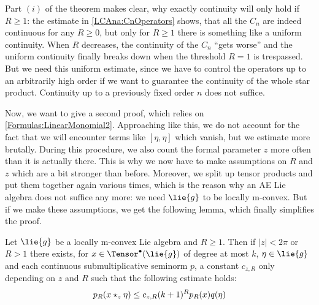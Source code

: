 \begin{remark}
	Part $(i)$ of the theorem makes clear, why exactly continuity will 
	only hold if $R \geq 1$: the estimate in \eqref{LCAna:CnOperators} shows, 
	that all the $C_n$ are indeed continuous for any $R \geq 0$, but only 
	for $R \geq 1$ there is something like a uniform continuity. When $R$ 
	decreases, the continuity of the $C_n$ ``gets worse'' and the uniform 
	continuity finally breaks down when the threshold $R = 1$ is trespassed. 
	But we need this uniform estimate, since we have to control the 
	operators up to an arbitrarily high order if we want to guarantee the 
	continuity of the whole star product. Continuity up to a previously fixed
	order $n$ does not suffice.
\end{remark}


Now, we want to give a second proof, which relies on 
\eqref{Formulas:LinearMonomial2}. Approaching like this, we do not account for 
the fact that we will encounter terms like $[\eta, \eta]$ which vanish, 
but we estimate more brutally. During this procedure, we also count the 
formal parameter $z$ more often than it is actually there. This is why we now 
have to make assumptions on $R$ and $z$ which are a bit stronger than before. 
Moreover, we split up tensor products and put them together again various 
times, which is the reason why an AE Lie algebra does not suffice any more: we 
need $\lie{g}$ to be locally m-convex. But if we make these assumptions, 
we get the following lemma, which finally simplifies the proof.
\begin{lemma}
    \label{LCAna:Lemma:PreContinuity2}%
    Let $\lie{g}$ be a locally m-convex Lie algebra and $R \geq1$. 
    Then if $|z| < 2 \pi$ or $R >1$ there exists, for $x \in
    \Tensor^{\bullet}(\lie{g})$ of degree at most $k$, $\eta \in \lie{g}$
    and each continuous submultiplicative seminorm $p$, a constant $c_{z,R}$ 
    only depending on $z$ and $R$ such that the following estimate holds:
    \begin{equation}
        \label{LCAna:PreContinuity2}
        p_R(x \star_z \eta)
        \leq
        c_{z,R} (k+1)^R p_R(x) q(\eta)
    \end{equation}
\end{lemma}
